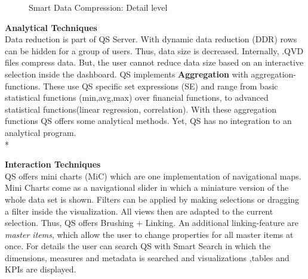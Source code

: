 \begin{figure}[H]
    \centering
    \qquad
    \caption{Smart Data Compression: Detail level}
    \label{fig:smartdatacompression}
\end{figure}

\textbf{Analytical Techniques}\\
Data reduction is part of QS Server. With dynamic data reduction (DDR) rows can be hidden for a group of users. Thus, data size is decreased. Internally, .QVD files compress data. But, the user cannot reduce data size based on an interactive selection inside the dashboard. 
QS implements \textbf{Aggregation} with aggregation-functions. These use QS specific set expressions (SE) and range from basic statistical functions (min,avg,max) over financial functions, to advanced statistical functions(linear regression, correlation). With these aggregation functions QS offers some analytical methods. Yet, QS has no integration to an analytical program.\\*

\textbf{Interaction Techniques}\\
QS offers mini charts (MiC) which are one implementation of navigational maps\cite{beard1990navigational}. Mini Charts come as a navigational slider in which a miniature version of the whole data set\cite{beard1990navigational} is shown. 
Filters can be applied by making selections or dragging a filter inside the visualization\cite{qlikSheet}. All views then are adapted to the current selection. Thus, QS offers Brushing + Linking. An additional linking-feature are \textit{master items}\cite{qlikChangeData}, which allow the user to change properties for all master items at once.
For details the user can search QS with Smart Search in which the dimensions, measures and metadata is searched and visualizations ,tables and KPIs are displayed\cite{qlikSmart}.  

